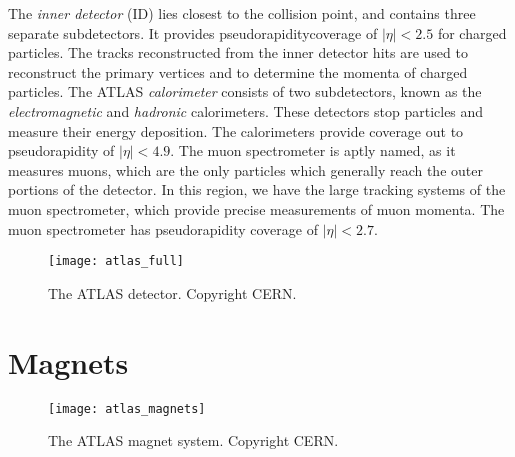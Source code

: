 The \textit{inner detector} (ID) lies closest to the collision point, and contains three separate subdetectors.
It provides pseudorapidity\footnotemark coverage of $|\eta| < 2.5$ for charged particles.
The tracks reconstructed from the inner detector hits are used to reconstruct the primary vertices and to determine the momenta of charged particles.
The ATLAS \textit{calorimeter} consists of two subdetectors, known as the \textit{electromagnetic} and \textit{hadronic} calorimeters.
These detectors stop particles and measure their energy deposition.
The calorimeters provide coverage out to pseudorapidity of $|\eta| < 4.9$.
The muon spectrometer is aptly named, as it measures  muons, which are the only particles which generally reach the outer portions of the detector.
In this region, we have the large tracking systems of the muon spectrometer, which provide precise measurements of muon momenta.
The muon spectrometer has pseudorapidity coverage of $|\eta| < 2.7$.

\begin{figure}[tbp]
\caption{The ATLAS detector. Copyright CERN.} \label{fig:atlas_full}
\texttt{[image: atlas\_full]}
\end{figure}

\section{Magnets}

\begin{figure}[tbp]
\caption{The ATLAS magnet system. Copyright CERN.} \label{fig:atlas_magnets}
\texttt{[image: atlas\_magnets]}
\end{figure}

